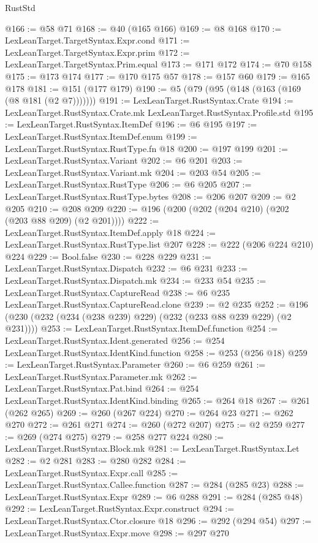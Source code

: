 \begin{lexlean}{RustStd}
\begin{coremodule}
{\begin{coremodule}
{{{{{{{{{{@166 := @58 @71
@168 := @40 (@165 @166)
@169 := @8 @168
@170 := LexLeanTarget.TargetSyntax.Expr.cond
@171 := LexLeanTarget.TargetSyntax.Expr.prim
@172 := LexLeanTarget.TargetSyntax.Prim.equal
@173 := @171 @172
@174 := @70 @158
@175 := @173 @174
@177 := @170 @175 @57
@178 := @157 @60
@179 := @165 @178
@181 := @151 (@177 @179)
@190 := @5 (@79 (@95 (@148 (@163 (@169 (@8 @181 (@2 @7)))))))
@191 := LexLeanTarget.RustSyntax.Crate
@194 := LexLeanTarget.RustSyntax.Crate.mk LexLeanTarget.RustSyntax.Profile.std
@195 := LexLeanTarget.RustSyntax.ItemDef
@196 := @6 @195
@197 := LexLeanTarget.RustSyntax.ItemDef.enum
@199 := LexLeanTarget.RustSyntax.RustType.fn @18
@200 := @197 @199
@201 := LexLeanTarget.RustSyntax.Variant
@202 := @6 @201
@203 := LexLeanTarget.RustSyntax.Variant.mk
@204 := @203 @54
@205 := LexLeanTarget.RustSyntax.RustType
@206 := @6 @205
@207 := LexLeanTarget.RustSyntax.RustType.bytes
@208 := @206 @207
@209 := @2 @205
@210 := @208 @209
@220 := @196 (@200 (@202 (@204 @210) (@202 (@203 @88 @209) (@2 @201))))
@222 := LexLeanTarget.RustSyntax.ItemDef.apply @18
@224 := LexLeanTarget.RustSyntax.RustType.list @207
@228 := @222 (@206 @224 @210) @224
@229 := Bool.false
@230 := @228 @229
@231 := LexLeanTarget.RustSyntax.Dispatch
@232 := @6 @231
@233 := LexLeanTarget.RustSyntax.Dispatch.mk
@234 := @233 @54
@235 := LexLeanTarget.RustSyntax.CaptureRead
@238 := @6 @235 LexLeanTarget.RustSyntax.CaptureRead.clone
@239 := @2 @235
@252 := @196 (@230 (@232 (@234 (@238 @239) @229) (@232 (@233 @88 @239 @229) (@2 @231))))
@253 := LexLeanTarget.RustSyntax.ItemDef.function
@254 := LexLeanTarget.RustSyntax.Ident.generated
@256 := @254 LexLeanTarget.RustSyntax.IdentKind.function
@258 := @253 (@256 @18)
@259 := LexLeanTarget.RustSyntax.Parameter
@260 := @6 @259
@261 := LexLeanTarget.RustSyntax.Parameter.mk
@262 := LexLeanTarget.RustSyntax.Pat.bind
@264 := @254 LexLeanTarget.RustSyntax.IdentKind.binding
@265 := @264 @18
@267 := @261 (@262 @265)
@269 := @260 (@267 @224)
@270 := @264 @23
@271 := @262 @270
@272 := @261 @271
@274 := @260 (@272 @207)
@275 := @2 @259
@277 := @269 (@274 @275)
@279 := @258 @277 @224
@280 := LexLeanTarget.RustSyntax.Block.mk
@281 := LexLeanTarget.RustSyntax.Let
@282 := @2 @281
@283 := @280 @282
@284 := LexLeanTarget.RustSyntax.Expr.call
@285 := LexLeanTarget.RustSyntax.Callee.function
@287 := @284 (@285 @23)
@288 := LexLeanTarget.RustSyntax.Expr
@289 := @6 @288
@291 := @284 (@285 @48)
@292 := LexLeanTarget.RustSyntax.Expr.construct
@294 := LexLeanTarget.RustSyntax.Ctor.closure @18
@296 := @292 (@294 @54)
@297 := LexLeanTarget.RustSyntax.Expr.move
@298 := @297 @270
}}}}}}}}}}
\end{coremodule}}
\end{coremodule}
\end{lexlean}
